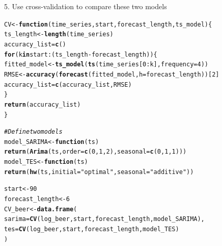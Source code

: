 \documentclass[10pt]{article}\usepackage[]{graphicx}\usepackage[]{color}
\makeatletter
\newcommand{\hlnum}[1]{\textcolor[rgb]{0.686,0.059,0.569}{#1}}%
\newcommand{\hlstr}[1]{\textcolor[rgb]{0.192,0.494,0.8}{#1}}%
\newcommand{\hlcom}[1]{\textcolor[rgb]{0.678,0.584,0.686}{\textit{#1}}}%
\newcommand{\hlopt}[1]{\textcolor[rgb]{0,0,0}{#1}}%
\newcommand{\hlstd}[1]{\textcolor[rgb]{0.345,0.345,0.345}{#1}}%
\newcommand{\hlkwa}[1]{\textcolor[rgb]{0.161,0.373,0.58}{\textbf{#1}}}%
\newcommand{\hlkwb}[1]{\textcolor[rgb]{0.69,0.353,0.396}{#1}}%
\newcommand{\hlkwc}[1]{\textcolor[rgb]{0.333,0.667,0.333}{#1}}%
\newcommand{\hlkwd}[1]{\textcolor[rgb]{0.737,0.353,0.396}{\textbf{#1}}}%
\newenvironment{kframe}{%
 \def\at@end@of@kframe{}%
 \ifinner\ifhmode%
  \def\at@end@of@kframe{\end{minipage}}%
  \begin{minipage}{\columnwidth}%
 \fi\fi%
 \def\FrameCommand##1{\hskip\@totalleftmargin \hskip-\fboxsep
 \colorbox{shadecolor}{##1}\hskip-\fboxsep
     \hskip-\linewidth \hskip-\@totalleftmargin \hskip\columnwidth}%
 \MakeFramed {\advance\hsize-\width
   \@totalleftmargin\z@ \linewidth\hsize
   \@setminipage}}%
 {\par\unskip\endMakeFramed%
 \at@end@of@kframe}
\newenvironment{knitrout}{}{} %
\makeatother
\begin{document}
5. Use cross-validation to compare these two models

\begin{knitrout}
\color{fgcolor}\begin{kframe}
\begin{alltt}
\hlstd{CV} \hlkwb{<-}  \hlkwa{function}\hlstd{(}\hlkwc{time_series}\hlstd{,} \hlkwc{start}\hlstd{,} \hlkwc{forecast_length}\hlstd{,}\hlkwc{ts_model}\hlstd{)\{}
  \hlstd{ts_length} \hlkwb{<-}  \hlkwd{length}\hlstd{(time_series)}
  \hlstd{accuracy_list} \hlkwb{=} \hlkwd{c}\hlstd{()}
  \hlkwa{for}\hlstd{(k} \hlkwa{in} \hlstd{start}\hlopt{:}\hlstd{(ts_length} \hlopt{-} \hlstd{forecast_length))\{}
    \hlstd{fitted_model} \hlkwb{<-} \hlkwd{ts_model}\hlstd{(}\hlkwd{ts}\hlstd{(time_series[}\hlnum{0}\hlopt{:}\hlstd{k],}\hlkwc{frequency} \hlstd{=} \hlnum{4}\hlstd{))}
    \hlstd{RMSE} \hlkwb{<-}  \hlkwd{accuracy}\hlstd{(}\hlkwd{forecast}\hlstd{(fitted_model,} \hlkwc{h} \hlstd{= forecast_length))[}\hlnum{2}\hlstd{]}
    \hlstd{accuracy_list} \hlkwb{=} \hlkwd{c}\hlstd{(accuracy_list, RMSE)}
  \hlstd{\}}
  \hlkwd{return}\hlstd{(accuracy_list)}
\hlstd{\}}

\hlcom{#Define two models}
\hlstd{model_SARIMA} \hlkwb{<-} \hlkwa{function}\hlstd{(}\hlkwc{ts}\hlstd{)}
  \hlkwd{return}\hlstd{(}\hlkwd{Arima}\hlstd{(ts,} \hlkwc{order} \hlstd{=} \hlkwd{c}\hlstd{(}\hlnum{0}\hlstd{,}\hlnum{1}\hlstd{,}\hlnum{2}\hlstd{),} \hlkwc{seasonal} \hlstd{=} \hlkwd{c}\hlstd{(}\hlnum{0}\hlstd{,}\hlnum{1}\hlstd{,}\hlnum{1}\hlstd{)))}
\hlstd{model_TES} \hlkwb{<-} \hlkwa{function}\hlstd{(}\hlkwc{ts}\hlstd{)}
  \hlkwd{return}\hlstd{(}\hlkwd{hw}\hlstd{(ts,}\hlkwc{initial} \hlstd{=} \hlstr{"optimal"}\hlstd{,} \hlkwc{seasonal} \hlstd{=} \hlstr{"additive"}\hlstd{))}

\hlstd{start} \hlkwb{<-} \hlnum{90}
\hlstd{forecast_length} \hlkwb{<-} \hlnum{6}
\hlstd{CV_beer} \hlkwb{<-} \hlkwd{data.frame}\hlstd{(}
  \hlkwc{sarima} \hlstd{=} \hlkwd{CV}\hlstd{(log_beer, start, forecast_length, model_SARIMA),}
  \hlkwc{tes} \hlstd{=} \hlkwd{CV}\hlstd{(log_beer, start, forecast_length, model_TES)}
\hlstd{)}


\end{alltt}
\end{kframe}
\end{knitrout}
\end{document}
